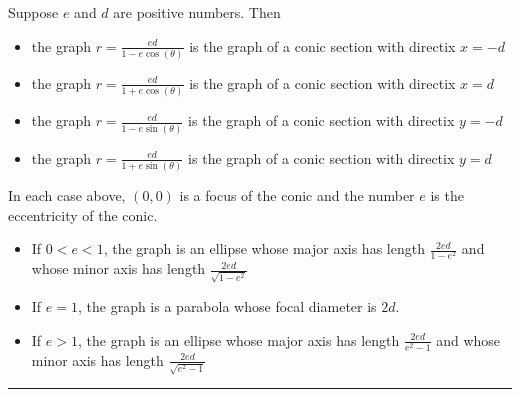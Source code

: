 \begin{theorem}
    Suppose $e$ and $d$ are positive numbers. Then
    
    \begin{itemize}
        \item the graph $r = \frac{ed}{1 - e \cos(\theta)}$ is the graph of a conic section with directix $x = -d$ 
        \item the graph $r = \frac{ed}{1 + e \cos(\theta)}$ is the graph of a conic section with directix $x = d$
        \item the graph $r = \frac{ed}{1 - e \sin(\theta)}$ is the graph of a conic section with directix $y = -d$
        \item the graph $r = \frac{ed}{1 + e \sin(\theta)}$ is the graph of a conic section with directix $y = d$
    \end{itemize}
    
    In each case above, $(0,0)$ is a focus of the conic and the number $e$ is the eccentricity of the conic.
    
    \begin{itemize}
        \item If $0 < e < 1$, the graph is an ellipse whose major axis has length $\frac{2ed}{1 - e^2}$ and whose minor axis has length $\frac{2ed}{\sqrt{1 - e^2}}$
        \item If $e = 1$, the graph is a parabola whose focal diameter is $2d$. 
        \item If $e > 1$, the graph is an ellipse whose major axis has length $\frac{2ed}{e^2 - 1}$ and whose minor axis has length $\frac{2ed}{\sqrt{e^2 - 1}}$
    \end{itemize}
    
    \medskip \hrule \medskip
\end{theorem}